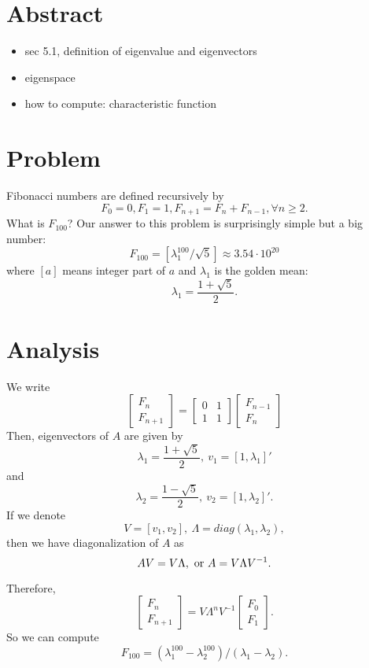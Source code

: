 \documentclass{article}
\begin{document}
\section{Abstract}
\begin{itemize}
 \item sec 5.1, definition of eigenvalue and eigenvectors
 \item eigenspace
 \item how to compute: characteristic function
\end{itemize}

\section{Problem}
Fibonacci numbers are defined recursively by
$$F_{0} = 0, F_{1} = 1, F_{n+1} = F_{n} + F_{n-1}, \forall n\ge 2.$$
What is $F_{100}$?
Our answer to this problem is surprisingly simple but a big number:
$$F_{100} = [\lambda_{1}^{100}/\sqrt 5] \approx 3.54\cdot 10^{20}$$
where $[a]$ means integer part of $a$ and $\lambda_{1}$ is the golden mean:
$$\lambda_{1} = \frac{1+ \sqrt 5}{2}.$$

\section{Analysis}
We write 
$$\left[ 
\begin{array}
 {ll}
 F_{n} \\
 F_{n+1}
\end{array}
\right]
= 
\left[ 
\begin{array}
 {ll}
 0 & 1 \\
1 & 1
\end{array}
\right]
\left[ 
\begin{array}
 {ll}
 F_{n-1} \\
 F_{n}
\end{array}
\right]
$$
Then, eigenvectors of $A$ are given by
$$\lambda_{1} = \frac{1+\sqrt 5}{2}, \ v_{1} = [1, \lambda_{1}]'$$
and 
$$\lambda_{2} = \frac{1 - \sqrt 5}{2}, \ v_{2} = [1, \lambda_{2}]'.$$
If we denote
$$V = [v_{1}, v_{2}], \ \Lambda = diag(\lambda_{1}, \lambda_{2}),$$
then we have diagonalization of $A$ as
$$AV = V\Lambda, \hbox{ or } A = V \Lambda V^{-1}.$$

Therefore, 
$$
\left[
\begin{array}
 {ll}
 F_{n} \\
 F_{n+1}
\end{array}
\right]
= 
V \Lambda^{n} V^{-1} 
\left[
\begin{array}
 {ll}
 F_{0} \\
 F_{1}
\end{array}
\right].
$$
So we can compute 
$$F_{100} = (\lambda_{1}^{100} - \lambda_{2}^{100})/(\lambda_{1} - 
\lambda_{2}).$$
\end{document}

